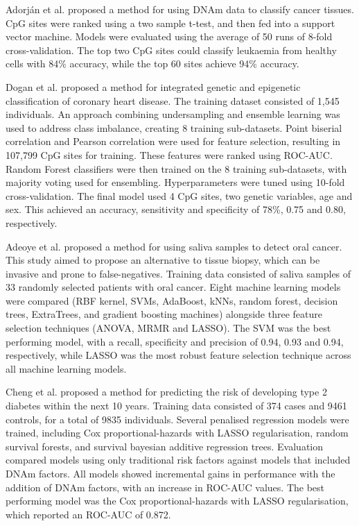 \documentclass{article} %
\begin{document}
Adorj\'an et al. \cite{adorjan2002tumour} proposed a method for using DNAm data to classify cancer tissues. CpG sites were ranked using a two sample t-test, and then fed into a support vector machine. Models were evaluated using the average of 50 runs of 8-fold cross-validation. The top two CpG sites could classify leukaemia from healthy cells with 84\% accuracy, while the top 60 sites achieve 94\% accuracy.

Dogan et al. \cite{dogan2018integrated} proposed a method for integrated genetic and epigenetic classification of coronary heart disease. The training dataset consisted of 1,545 individuals. An approach combining undersampling and ensemble learning \cite{liu2008exploratory} was used to address class imbalance, creating 8 training sub-datasets. Point biserial correlation and Pearson correlation were used for feature selection, resulting in 107,799 CpG sites for training. These features were ranked using ROC-AUC. Random Forest classifiers were then trained on the 8 training sub-datasets, with majority voting used for ensembling. Hyperparameters were tuned using 10-fold cross-validation. The final model used 4 CpG sites, two genetic variables, age and sex. This achieved an accuracy, sensitivity and specificity of 78\%, 0.75 and 0.80, respectively.

Adeoye et al. \cite{adeoye2022machine} proposed a method for using saliva samples to detect oral cancer. This study aimed to propose an alternative to tissue biopsy, which can be invasive and prone to false-negatives. Training data consisted of saliva samples of 33 randomly selected patients with oral cancer. Eight machine learning models were compared (RBF kernel, SVMs, AdaBoost, kNNs, random forest, decision trees, ExtraTrees, and gradient boosting machines) alongside three feature selection techniques (ANOVA, MRMR and LASSO). The SVM was the best performing model, with a recall, specificity and precision of 0.94, 0.93 and 0.94, respectively, while LASSO was the most robust feature selection technique across all machine learning models.

Cheng et al. \cite{cheng2023development} proposed a method for predicting the risk of developing type 2 diabetes within the next 10 years. Training data consisted of 374 cases and \num{9461} controls, for a total of \num{9835} individuals. Several penalised regression models were trained, including Cox proportional-hazards with LASSO regularisation, random survival forests, and survival bayesian additive regression trees. Evaluation compared models using only traditional risk factors against models that included DNAm factors. All models showed incremental gains in performance with the addition of DNAm factors, with an increase in ROC-AUC values. The best performing model was the Cox proportional-hazards with LASSO regularisation, which reported an ROC-AUC of 0.872.
\end{document}
